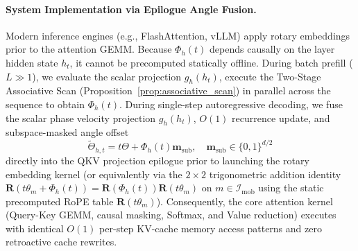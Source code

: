 \documentclass[11pt,a4paper]{article}
\theoremstyle{definition}
\begin{document}
\paragraph{System Implementation via Epilogue Angle Fusion.}
Modern inference engines (e.g., FlashAttention, vLLM) apply rotary embeddings prior to the attention GEMM. Because $\Phi_h(t)$ depends causally on the layer hidden state $h_t$, it cannot be precomputed statically offline. During batch prefill ($L \gg 1$), we evaluate the scalar projection $g_h(h_t)$, execute the Two-Stage Associative Scan (Proposition~\ref{prop:associative_scan}) in parallel across the sequence to obtain $\Phi_h(t)$. During single-step autoregressive decoding, we fuse the scalar phase velocity projection $g_h(h_t)$, $O(1)$ recurrence update, and subspace-masked angle offset
\begin{equation}
\tilde{\Theta}_{h,t} = t\Theta + \Phi_h(t)\mathbf{m}_{\text{sub}}, \quad \mathbf{m}_{\text{sub}} \in \{0, 1\}^{d/2}
\end{equation}
directly into the QKV projection epilogue prior to launching the rotary embedding kernel (or equivalently via the $2\times 2$ trigonometric addition identity $\mathbf{R}(t\theta_m + \Phi_h(t)) = \mathbf{R}(\Phi_h(t))\mathbf{R}(t\theta_m)$ on $m \in \mathcal{I}_{\text{mob}}$ using the static precomputed RoPE table $\mathbf{R}(t\theta_m)$). Consequently, the core attention kernel (Query-Key GEMM, causal masking, Softmax, and Value reduction) executes with identical $O(1)$ per-step KV-cache memory access patterns and zero retroactive cache rewrites.
\end{document}
